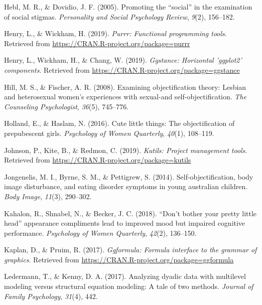 \documentclass[
  man]{apa6}
\begin{document}
\leavevmode\hypertarget{ref-hebl2005promoting}{}%
Hebl, M. R., \& Dovidio, J. F. (2005). Promoting the ``social'' in the examination of social stigmas. \emph{Personality and Social Psychology Review}, \emph{9}(2), 156--182.

\leavevmode\hypertarget{ref-R-purrr}{}%
Henry, L., \& Wickham, H. (2019). \emph{Purrr: Functional programming tools}. Retrieved from \url{https://CRAN.R-project.org/package=purrr}

\leavevmode\hypertarget{ref-R-ggstance}{}%
Henry, L., Wickham, H., \& Chang, W. (2019). \emph{Ggstance: Horizontal 'ggplot2' components}. Retrieved from \url{https://CRAN.R-project.org/package=ggstance}

\leavevmode\hypertarget{ref-hill2008examining}{}%
Hill, M. S., \& Fischer, A. R. (2008). Examining objectification theory: Lesbian and heterosexual women's experiences with sexual-and self-objectification. \emph{The Counseling Psychologist}, \emph{36}(5), 745--776.

\leavevmode\hypertarget{ref-holland2016}{}%
Holland, E., \& Haslam, N. (2016). Cute little things: The objectification of prepubescent girls. \emph{Psychology of Women Quarterly}, \emph{40}(1), 108--119.

\leavevmode\hypertarget{ref-R-kutils}{}%
Johnson, P., Kite, B., \& Redmon, C. (2019). \emph{Kutils: Project management tools}. Retrieved from \url{https://CRAN.R-project.org/package=kutils}

\leavevmode\hypertarget{ref-jongenelis2014}{}%
Jongenelis, M. I., Byrne, S. M., \& Pettigrew, S. (2014). Self-objectification, body image disturbance, and eating disorder symptoms in young australian children. \emph{Body Image}, \emph{11}(3), 290--302.

\leavevmode\hypertarget{ref-kahalon2018don}{}%
Kahalon, R., Shnabel, N., \& Becker, J. C. (2018). ``Don't bother your pretty little head'' appearance compliments lead to improved mood but impaired cognitive performance. \emph{Psychology of Women Quarterly}, \emph{42}(2), 136--150.

\leavevmode\hypertarget{ref-R-ggformula}{}%
Kaplan, D., \& Pruim, R. (2017). \emph{Ggformula: Formula interface to the grammar of graphics}. Retrieved from \url{https://CRAN.R-project.org/package=ggformula}

\leavevmode\hypertarget{ref-ledermann2017analyzing}{}%
Ledermann, T., \& Kenny, D. A. (2017). Analyzing dyadic data with multilevel modeling versus structural equation modeling: A tale of two methods. \emph{Journal of Family Psychology}, \emph{31}(4), 442.
\end{document}

